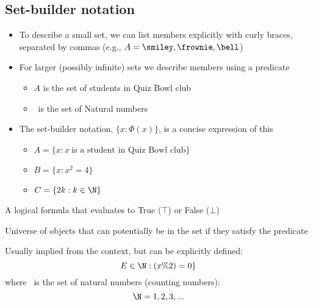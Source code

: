 \subsection{Set-builder notation}
\begin{itemize}
    \item To describe a small set, we can list members explicitly with curly braces, separated by commas (e.g., $A={\smiley,\frownie,\bell}$) 
    \item For larger (possibly infinite) sets we describe members using a predicate
        \begin{itemize}
            \item $A$ is the set of students in Quiz Bowl club
            \item \N\ is the set of Natural numbers 
        \end{itemize}
    \item The set-builder notation, $\{x:\Phi(x)\}$, is a concise expression of this
        \begin{itemize}
            \item $A=\{x:x\ \text{is a student in Quiz Bowl club}\}$
            \item $B=\{x:x^2=4\}$
            \item $C=\{2k:k\in\N\}$
        
        \end{itemize}
\end{itemize}
\begin{definition*}[Predicate]\label{def:predicate}
    A logical formula that evaluates to True ($\top$) or False ($\bot$)
\end{definition*}
\begin{definition*}\label{def:domain-of-discourse}
    Universe of objects that can potentially be in the set if they satisfy the predicate

    Usually implied from the context, but can be explicitly defined:
    \[
    E \in \N:(x\%2)=0\}
    \]
    where \N\ is the set of natural numbers (counting numbers):
    \[
    \N = {1,2,3,...}
    \]
    
\end{definition*}

